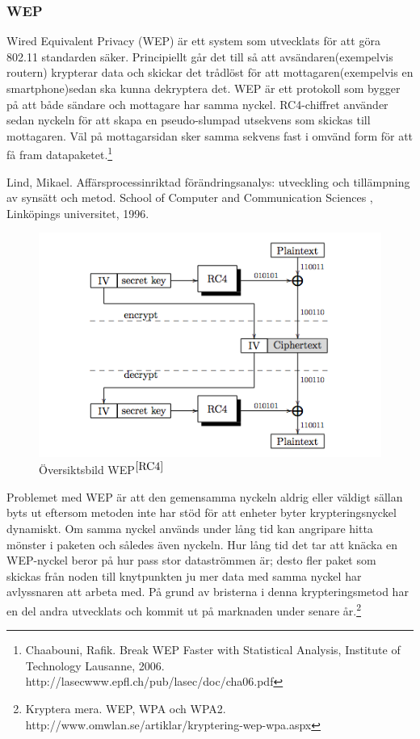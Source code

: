 \documentclass[a4paper,12pt,fleqn]{article}
\begin{document}
\subsubsection{WEP}
Wired Equivalent Privacy (WEP) är ett system som utvecklats för att göra 802.11 standarden säker. Principiellt går det till så att avsändaren(exempelvis routern) krypterar data och skickar det trådlöst för att mottagaren(exempelvis en smartphone)sedan ska kunna dekryptera det. WEP är ett protokoll som bygger på att både sändare och mottagare har samma nyckel. RC4-chiffret använder sedan nyckeln för att skapa en pseudo-slumpad utsekvens som skickas till mottagaren. Väl på mottagarsidan sker samma sekvens fast i omvänd form för att få fram datapaketet.\footnote{\label{RC4}Chaabouni, Rafik. Break WEP Faster with Statistical Analysis, Institute of Technology Lausanne, 2006. http://lasecwww.epfl.ch/pub/lasec/doc/cha06.pdf}

Lind, Mikael. Affärsprocessinriktad förändringsanalys: utveckling och tillämpning av synsätt och metod. School of Computer and Communication Sciences
, Linköpings universitet, 1996.

\begin{figure}[htp]
  \begin{center}
  \includegraphics[keepaspectratio=true,width=0.5\linewidth]{WEP}  %
  \caption{Översiktsbild WEP$^{\ref{RC4}}$} %
  \end{center}
  \label{fig:overview}
\end{figure}
\newpage
Problemet med WEP är att den gemensamma nyckeln aldrig eller väldigt sällan byts ut eftersom metoden inte har stöd för att enheter byter krypteringsnyckel dynamiskt. Om samma nyckel används under lång tid kan angripare hitta mönster i paketen och således även nyckeln. Hur lång tid det tar att knäcka en WEP-nyckel beror på hur pass stor dataströmmen är; desto fler paket som skickas från noden till knytpunkten ju mer data med samma nyckel har avlyssnaren att arbeta med. På grund av bristerna i denna krypteringsmetod har en del andra utvecklats och kommit ut på marknaden under senare år.\footnote{\label{WEP}Kryptera mera. WEP, WPA och WPA2. http://www.omwlan.se/artiklar/kryptering-wep-wpa.aspx }
\end{document}
